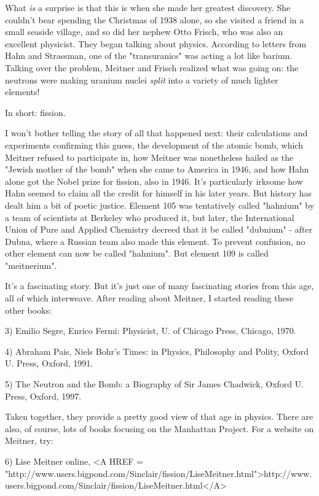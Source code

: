 What \emph{is} a surprise is that this is when she made her greatest
discovery.  She couldn't bear spending the Christmas of 1938 alone, so
she visited a friend in a small seaside village, and so did her nephew
Otto Frisch, who was also an excellent physicist.  They began talking
about physics.  According to letters from Hahn and Strassman, one of the
"transuranics" was acting a lot like barium.  Talking over the
problem, Meitner and Frisch realized what was going on: the neutrons
were making uranium nuclei \emph{split} into a variety of much lighter
elements!

In short: fission.


I won't bother telling the story of all that happened next: their
calculations and experiments confirming this guess, the development of
the atomic bomb, which Meitner refused to participate in, how Meitner
was nonetheless hailed as the "Jewish mother of the bomb" when
she came to America in 1946, and how Hahn alone got the Nobel prize for
fission, also in 1946.  It's particularly irksome how Hahn seemed to
claim all the credit for himself in his later years.  But history has
dealt him a bit of poetic justice.  Element 105 was tentatively called
"hahnium" by a team of scientists at Berkeley who produced it,
but later, the International Union of Pure and Applied Chemistry decreed
that it be called "dubnium" - after Dubna, where a Russian
team also made this element.  To prevent confusion, no other element can
now be called "hahnium".  But element 109 is called
"meitnerium".

It's a fascinating story.  But it's just one of many fascinating stories
from this age, all of which interweave.  After reading about Meitner, I
started reading these other books:

3) Emilio Segre, Enrico Fermi: Physicist, U. of Chicago Press, Chicago,
1970.

4) Abraham Pais, Niels Bohr's Times: in Physics, Philosophy and Polity,
Oxford U. Press, Oxford, 1991.

5) The Neutron and the Bomb: a Biography of Sir James Chadwick, Oxford
U. Press, Oxford, 1997.

Taken together, they provide a pretty good view of that age in physics.
There are also, of course, lots of books focusing on the Manhattan 
Project.   For a website on Meitner, try:

6) Lise Meitner online, <A HREF = "http://www.users.bigpond.com/Sinclair/fission/LiseMeitner.html">http://www.users.bigpond.com/Sinclair/fission/LiseMeitner.html</A>

